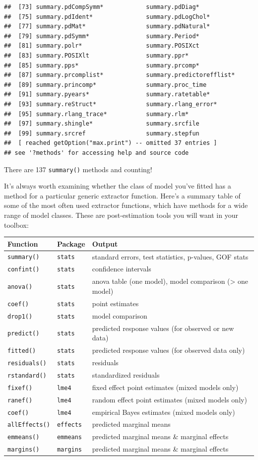 \documentclass[
]{book}
\begin{document}
\begin{verbatim}
##  [73] summary.pdCompSymm*            summary.pdDiag*               
##  [75] summary.pdIdent*               summary.pdLogChol*            
##  [77] summary.pdMat*                 summary.pdNatural*            
##  [79] summary.pdSymm*                summary.Period*               
##  [81] summary.polr*                  summary.POSIXct               
##  [83] summary.POSIXlt                summary.ppr*                  
##  [85] summary.pps*                   summary.prcomp*               
##  [87] summary.prcomplist*            summary.predictorefflist*     
##  [89] summary.princomp*              summary.proc_time             
##  [91] summary.pyears*                summary.ratetable*            
##  [93] summary.reStruct*              summary.rlang_error*          
##  [95] summary.rlang_trace*           summary.rlm*                  
##  [97] summary.shingle*               summary.srcfile               
##  [99] summary.srcref                 summary.stepfun               
##  [ reached getOption("max.print") -- omitted 37 entries ]
## see '?methods' for accessing help and source code
\end{verbatim}

There are 137 \texttt{summary()} methods and counting!

It's always worth examining whether the class of model you've fitted has a method for a particular generic extractor function. Here's a summary table of some of the most often used extractor functions, which have methods for a wide range of model classes. These are post-estimation tools you will want in your toolbox:

\begin{longtable}[]{@{}lll@{}}
\toprule
Function & Package & Output\tabularnewline
\midrule
\endhead
\texttt{summary()} & \texttt{stats} & standard errors, test statistics, p-values, GOF stats\tabularnewline
\texttt{confint()} & \texttt{stats} & confidence intervals\tabularnewline
\texttt{anova()} & \texttt{stats} & anova table (one model), model comparison (\textgreater{} one model)\tabularnewline
\texttt{coef()} & \texttt{stats} & point estimates\tabularnewline
\texttt{drop1()} & \texttt{stats} & model comparison\tabularnewline
\texttt{predict()} & \texttt{stats} & predicted response values (for observed or new data)\tabularnewline
\texttt{fitted()} & \texttt{stats} & predicted response values (for observed data only)\tabularnewline
\texttt{residuals()} & \texttt{stats} & residuals\tabularnewline
\texttt{rstandard()} & \texttt{stats} & standardized residuals\tabularnewline
\texttt{fixef()} & \texttt{lme4} & fixed effect point estimates (mixed models only)\tabularnewline
\texttt{ranef()} & \texttt{lme4} & random effect point estimates (mixed models only)\tabularnewline
\texttt{coef()} & \texttt{lme4} & empirical Bayes estimates (mixed models only)\tabularnewline
\texttt{allEffects()} & \texttt{effects} & predicted marginal means\tabularnewline
\texttt{emmeans()} & \texttt{emmeans} & predicted marginal means \& marginal effects\tabularnewline
\texttt{margins()} & \texttt{margins} & predicted marginal means \& marginal effects\tabularnewline
\bottomrule
\end{longtable}
\end{document}

